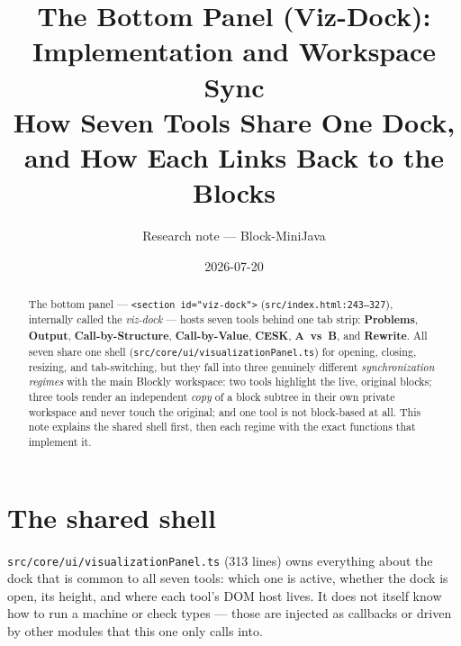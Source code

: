 \documentclass[11pt]{article}
\title{The Bottom Panel (Viz-Dock): Implementation and Workspace Sync\\
\large How Seven Tools Share One Dock, and How Each Links Back to the Blocks}
\author{Research note --- Block-MiniJava}
\date{2026-07-20}
\begin{document}
\maketitle

\begin{abstract}
The bottom panel --- \texttt{<section id="viz-dock">}
(\texttt{src/index.html:243--327}), internally called the \emph{viz-dock}
--- hosts seven tools behind one tab strip: \textbf{Problems},
\textbf{Output}, \textbf{Call-by-Structure}, \textbf{Call-by-Value},
\textbf{CESK}, \textbf{A~vs~B}, and \textbf{Rewrite}. All seven share one
shell (\texttt{src/core/ui/visualizationPanel.ts}) for opening, closing,
resizing, and tab-switching, but they fall into three genuinely different
\emph{synchronization regimes} with the main Blockly workspace: two tools
highlight the live, original blocks; three tools render an independent
\emph{copy} of a block subtree in their own private workspace and never
touch the original; and one tool is not block-based at all. This note
explains the shared shell first, then each regime with the exact functions
that implement it.
\end{abstract}

\tableofcontents

\section{The shared shell}

\texttt{src/core/ui/visualizationPanel.ts} (313 lines) owns everything
about the dock that is common to all seven tools: which one is active,
whether the dock is open, its height, and where each tool's DOM host lives.
It does not itself know how to run a machine or check types --- those are
injected as callbacks or driven by other modules that this one only calls
into.
\end{document}
